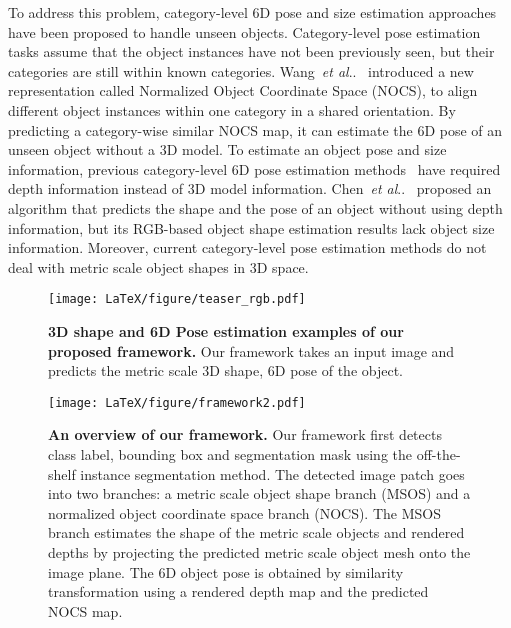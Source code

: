 \documentclass[letterpaper, 10 pt, journal, twoside]{IEEEtran}
\makeatletter
\DeclareRobustCommand\onedot{\futurelet\@let@token\@onedot}
\def\@onedot{\ifx\@let@token.\else.\null\fi\xspace}
\def\etal{\emph{et al}\onedot}
\makeatother
\begin{document}
To address this problem, category-level 6D pose and size estimation approaches have been proposed to handle unseen objects.
Category-level pose estimation tasks assume that the object instances have not been previously seen, but their categories are still within known categories. 
Wang~\etal~\cite{wang2019normalized} introduced a new representation called Normalized Object Coordinate Space (NOCS), to align different object instances within one category in a shared orientation.
By predicting a category-wise similar NOCS map, it can estimate the 6D pose of an unseen object without a 3D model.
To estimate an object pose and size information, previous category-level 6D pose estimation methods~\cite{wang2019normalized, Tian2020prior, chen2020cass} have required depth information instead of 3D model information.
Chen~\etal~\cite{chen2020Synthesis} proposed an algorithm that predicts the shape and the pose of an object without using depth information, but its RGB-based object shape estimation results lack object size information. 
Moreover, current category-level pose estimation methods do not deal with metric scale object shapes in 3D space.

\begin{figure}
\begin{center}
\texttt{[image: LaTeX/figure/teaser\_rgb.pdf]} \\
\caption{\textbf{3D shape and 6D Pose estimation examples of our proposed framework.} Our framework takes an input image and predicts the metric scale 3D shape, 6D pose of the object.
}\label{fig:main}
\end{center}
\vspace{-5mm}
\end{figure}

\begin{figure*}
\begin{center}
\texttt{[image: LaTeX/figure/framework2.pdf]} \\
\caption{\textbf{An overview of our framework.} Our framework first detects class label, bounding box and segmentation mask using the off-the-shelf instance segmentation method. The detected image patch goes into two branches: a metric scale object shape branch (MSOS) and a normalized object coordinate space branch (NOCS).
The MSOS branch estimates the shape of the metric scale objects and rendered depths by projecting the predicted metric scale object mesh onto the image plane.
The 6D object pose is obtained by similarity transformation using a rendered depth map and the predicted NOCS map.
}
\label{fig:framework}
\end{center}
\vspace{-5mm}
\end{figure*}
\end{document}
